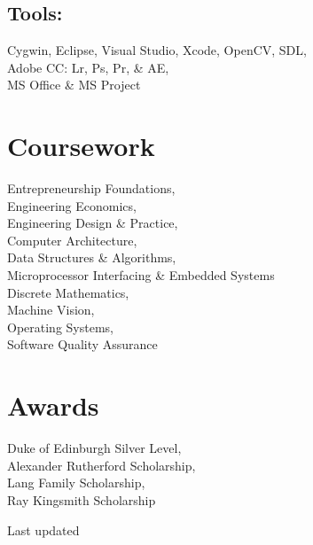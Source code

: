 \documentclass[]{hieudo-build}
\begin{document}
\begin{minipage}[t]{0.3\textwidth}
\subsection{Tools:}
Cygwin, Eclipse, Visual Studio, 
Xcode, OpenCV, SDL, \\
Adobe CC: Lr, Ps, Pr, \& AE, \\
MS Office \& MS Project \\ 

\sectionsep



\section{Coursework}
Entrepreneurship Foundations,\\
Engineering Economics,\\
Engineering Design \& Practice,\\
Computer Architecture, \\
Data Structures \& Algorithms,\\
Microprocessor Interfacing
\& Embedded Systems \\
Discrete Mathematics, \\
Machine Vision,\\
Operating Systems,\\
Software Quality Assurance\\
\sectionsep

\section{Awards}
Duke of Edinburgh Silver Level,\\
Alexander Rutherford Scholarship, \\
Lang Family Scholarship, \\
Ray Kingsmith Scholarship \\
\sectionsep

\sectionsep
{}
Last updated 

%
%
\end{minipage} 
\end{document}
